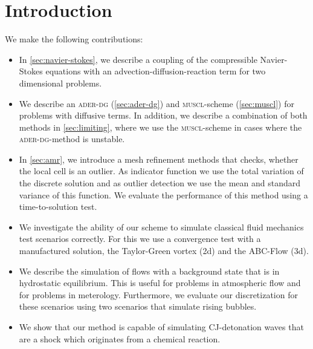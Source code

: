 \chapter{Introduction}\label{chap:introduction}
We make the following contributions:
\begin{itemize}
\item In \cref{sec:navier-stokes}, we describe a coupling of the compressible Navier-Stokes equations with an advection-diffusion-reaction term for two dimensional problems.
\item We describe an \textsc{ader-dg} (\cref{sec:ader-dg}) and \textsc{muscl}-scheme (\cref{sec:muscl}) for problems with diffusive terms.
  In addition, we describe a combination of both methods in \cref{sec:limiting}, where we use the \textsc{muscl}-scheme in cases where the \textsc{ader-dg}-method is unstable.
\item In \cref{sec:amr}, we introduce a mesh refinement methods that checks, whether the local cell is an outlier.
  As indicator function we use the total variation of the discrete solution and as outlier detection we use the mean and standard variance of this function.
  We evaluate the performance of this method using a time-to-solution test.
\item We investigate the ability of our scheme to simulate classical fluid mechanics test scenarios correctly.
  For this we use a convergence test with a manufactured solution, the Taylor-Green vortex (2d) and the ABC-Flow (3d).
\item We describe the simulation of flows with a background state that is in hydrostatic equilibrium.
  This is useful for problems in atmospheric flow and for problems in meterology.
  Furthermore, we evaluate our discretization for these scenarios using two scenarios that simulate rising bubbles.
\item We show that our method is capable of simulating CJ-detonation waves that are a shock which originates from a chemical reaction.
\end{itemize}

